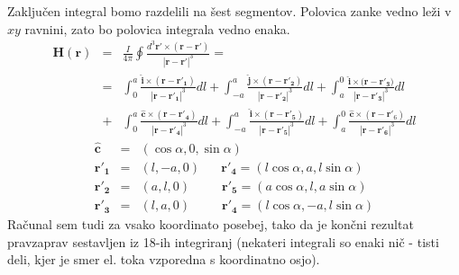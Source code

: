 \documentclass[12pt, a4paper]{article}
\begin{document}
Zaključen integral bomo razdelili na šest segmentov. %
Polovica zanke vedno leži v $xy$ ravnini, zato bo polovica integrala vedno enaka.
\begin{eqnarray}
  \mathbf{H}(\mathbf{r})& = & \frac{I}{4\pi}\oint\frac{ d^3\mathbf{r'} \times( \mathbf{r}- \mathbf{r'})}{| \mathbf{r} -  \mathbf{r'}|^3} =  \nonumber \\
& = & \int_0^a\frac{\mathbf{\hat{i}} \times (\mathbf{r} - \mathbf{r'_1})}{ |\mathbf{r} - \mathbf{r'_1} |^3}dl + \int_{-a}^a\frac{\mathbf{\hat{j}} \times (\mathbf{r} - \mathbf{r'_2}) }{ |\mathbf{r} - \mathbf{r'_2} |^3} dl + \int_a^0 \frac{\mathbf{\hat{i}} \times (\mathbf{r- r'_3)}}{ | \mathbf{r - r'_3} |^3} dl \nonumber \\
& + & \int_0^a\frac{\mathbf{\hat{c}} \times (\mathbf{r} - \mathbf{r'_4})}{ | \mathbf{r - r'_4} |^3} dl + \int_{-a}^a\frac{\mathbf{\hat{i}} \times (\mathbf{r} - \mathbf{r'_5})}{ | \mathbf{r - r'_5} |^3} dl + \int_a^0\frac{\mathbf{\hat{c}} \times (\mathbf{r} - \mathbf{r'}_6)}{ | \mathbf{r - r'_6} |^3} dl  \nonumber
\end{eqnarray}
\begin{eqnarray}
\mathbf{\hat{c}} & = & (\cos \alpha, 0, \sin \alpha) \nonumber \\
\mathbf{r'_1} & = & (l, -a, 0) \;\;\;\;\;\;     \mathbf{r'_4}  = (l\cos \alpha, a, l\sin \alpha) \nonumber \\
\mathbf{r'_2} & = & (a, l, 0)  \;\;\;\;\;\;\;\;\;  \mathbf{r'_5}  = (a \cos \alpha, l, a\sin \alpha) \nonumber \\
\mathbf{r'_3} & = & (l, a, 0)  \;\;\;\;\;\;\;\;\;  \mathbf{r'_4}  = (l\cos \alpha, -a, l\sin \alpha) \nonumber 
\end{eqnarray}
Računal sem tudi za vsako koordinato posebej, tako da je končni rezultat pravzaprav sestavljen iz 18-ih integriranj (nekateri integrali so enaki nič - tisti deli, kjer je smer el. toka vzporedna s koordinatno osjo).
\end{document}
